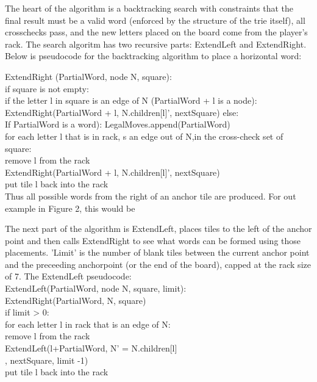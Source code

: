 \documentclass[12pt]{article}
\begin{document}
The heart of the algorithm is a backtracking search with constraints
that the final result must be a valid word (enforced by the structure
of the trie itself), all crosschecks pass, and the new letters placed
on the board come from the player's rack. The search algoritm has two
recursive parts: ExtendLeft and ExtendRight. Below is pseudocode for
the backtracking algorithm to place a horizontal word:

	ExtendRight (PartialWord, node N, square):\\
		if square is not empty:\\
			if the letter l in square is an edge of N (PartialWord + l is a node):\\
				ExtendRight(PartialWord + l, N.children[l]', nextSquare)
		else:\\
			If PartialWord is a word): LegalMoves.append(PartialWord)\\
			for each letter l that is in rack, s an edge out of N,in the cross-check set of square:\\
					remove l from the rack\\
					ExtendRight(PartialWord + l, N.children[l]', nextSquare)\\
					put tile l back into the rack\\

Thus all possible words from the right of an anchor tile are produced. For out example in Figure 2, this would be 


The next part of the algorithm is ExtendLeft, places tiles to the left
of the anchor point and then calls ExtendRight to see what words can
be formed using those placements. 'Limit' is the number of blank tiles
between the current anchor point and the preceeding anchorpoint (or the end of the board), capped at the rack size of 7. The ExtendLeft pseudocode: \\

	ExtendLeft(PartialWord, node N, square, limit):\\
		ExtendRight(PartialWord, N, square)\\
		if limit > 0: \\
			for each letter l in rack that is an edge of N: \\
					remove l from the rack\\
					ExtendLeft(l+PartialWord, N' = N.children[l]\\, nextSquare, limit -1)\\
					put tile l back into the rack\\
			
\end{document}
